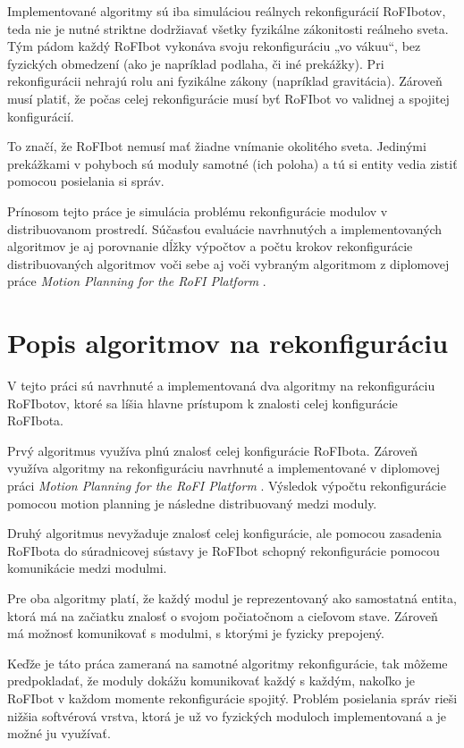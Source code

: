 \documentclass[
  digital, %
  oneside, %
  notable,   %
  lof,     %
  nolot,     %
]{fithesis3}
\begin{document}
Implementované algoritmy sú iba simuláciou reálnych rekonfigurácií RoFIbotov, teda nie je nutné striktne dodržiavať všetky fyzikálne zákonitosti reálneho sveta. Tým pádom každý RoFIbot vykonáva svoju rekonfiguráciu „vo vákuu“, bez fyzických obmedzení (ako je napríklad podlaha, či iné prekážky). Pri rekonfigurácii nehrajú rolu ani fyzikálne zákony (napríklad gravitácia). Zároveň musí platiť, že počas celej rekonfigurácie musí byť RoFIbot vo validnej a spojitej konfigurácií. 

To značí, že RoFIbot nemusí mať žiadne vnímanie okolitého sveta. Jedinými prekážkami v pohyboch sú moduly samotné (ich poloha) a tú si entity vedia zistiť pomocou posielania si správ. 

Prínosom tejto práce je simulácia problému rekonfigurácie modulov v distribuovanom prostredí. Súčasťou evaluácie navrhnutých a implementovaných algoritmov je aj porovnanie dĺžky výpočtov a počtu krokov rekonfigurácie distribuovaných algoritmov voči sebe aj voči vybraným algoritmom z diplomovej práce \textit{Motion Planning for the RoFI Platform} \cite{vozarovaMasterThesis}. 

\section{Popis algoritmov na rekonfiguráciu}
\label{sec:algoDesc}
V tejto práci sú navrhnuté a implementovaná dva algoritmy na rekonfiguráciu RoFIbotov, ktoré sa líšia hlavne prístupom k znalosti celej konfigurácie RoFIbota. 

Prvý algoritmus využíva plnú znalosť celej konfigurácie RoFIbota. Zároveň využíva algoritmy na rekonfiguráciu navrhnuté a implementované v diplomovej práci \textit{Motion Planning for the RoFI Platform} \cite{vozarovaMasterThesis}. Výsledok výpočtu rekonfigurácie pomocou motion planning je následne distribuovaný medzi moduly. 

Druhý algoritmus nevyžaduje znalosť celej konfigurácie, ale pomocou zasadenia RoFIbota do súradnicovej sústavy je RoFIbot schopný rekonfigurácie pomocou komunikácie medzi modulmi. 

Pre oba algoritmy platí, že každý modul je reprezentovaný ako samostatná entita, ktorá má na začiatku znalosť o svojom počiatočnom a cieľovom stave. Zároveň má možnosť komunikovať s modulmi, s ktorými je fyzicky prepojený. 

Keďže je táto práca zameraná na samotné algoritmy rekonfigurácie, tak môžeme predpokladať, že moduly dokážu komunikovať každý s každým, nakoľko je RoFIbot v každom momente rekonfigurácie spojitý. Problém posielania správ rieši nižšia softvérová vrstva, ktorá je už vo fyzických moduloch implementovaná a je možné ju využívať. 
\end{document}
